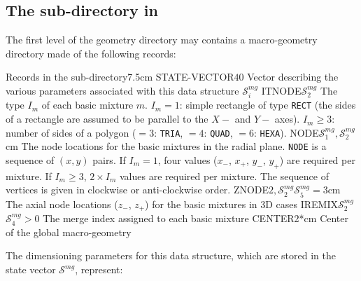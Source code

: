 \goodbreak

\subsection{The  sub-directory in }\label{sect:geometrymacro}

The first level of the geometry directory may contains a macro-geometry directory  made of the
following records:

\begin{DescriptionEnregistrement}{Records in the  sub-directory}{7.5cm}
\IntEnr
  {STATE-VECTOR}{$40$}
  {Vector describing the various parameters associated with this data structure $\mathcal{S}^{mg}_{i}$}
\IntEnr
  {ITNODE}{$\mathcal{S}^{mg}_{2}$}
  {The type $I_m$ of each basic mixture $m$. $I_m=1$: simple rectangle of type {\tt RECT} (the sides of a  rectangle are assumed to be parallel to the $X-$ and $Y-$ axes).
   $I_m\ge 3$: number of sides of a polygon ($=3$: {\tt TRIA}, $=4$: {\tt QUAD}, $=6$: {\tt HEXA}).
  }
\RealEnr
  {NODE}{$\mathcal{S}^{mg}_{1},\mathcal{S}^{mg}_{2}$}{cm}
  {The node locations for the basic mixtures in the radial plane. {\tt NODE} is a sequence of $(x,y)$ pairs. If $I_m=1$, four values ($x_-$, $x_+$, $y_-$, $y_+$) are required per mixture.
  If $I_m\ge 3$, $2\times I_m$ values are required per mixture. The sequence of vertices is given in clockwise or anti-clockwise order.}
\OptRealEnr
  {ZNODE}{$2,\mathcal{S}^{mg}_{2}$}{$\mathcal{S}^{mg}_{5}=3$}{cm}
  {The axial node locations ($z_-$, $z_+$) for the basic mixtures in 3D cases}
\OptIntEnr
  {IREMIX}{$\mathcal{S}^{mg}_{2}$}{$\mathcal{S}^{mg}_{4}>0$}
  {The merge index assigned to each basic mixture}
\OptRealEnr
  {CENTER}{2}{*}{cm}
  {Center of the global macro-geometry}
\end{DescriptionEnregistrement}

The dimensioning parameters for this data structure, which are stored in the state vector $\mathcal{S}^{mg}$, represent:

